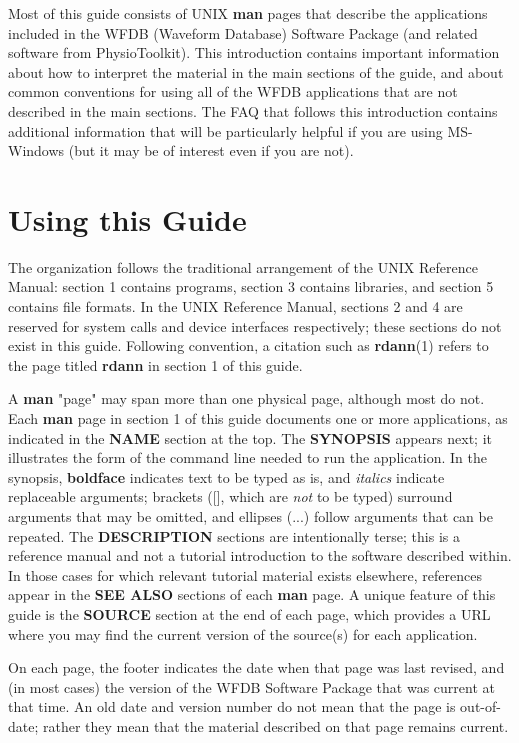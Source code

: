 \documentclass[twoside]{book}
\begin{document}
Most of this guide consists of UNIX \textbf{man} pages that describe the
applications included in the WFDB (Waveform Database) Software
Package (and related software from PhysioToolkit).  This introduction
contains important information about how to interpret the material in
the main sections of the guide, and about common conventions for using
all of the WFDB applications that are not described in the main sections.
The FAQ that follows this introduction contains additional information
that will be particularly helpful if you are using MS-Windows (but it
may be of interest even if you are not).

\section*{Using this Guide}

The organization follows the traditional arrangement of the UNIX Reference
Manual:  section 1 contains programs, section 3 contains libraries, and
section 5 contains file formats.  In the UNIX Reference Manual, sections
2 and 4 are reserved for system calls and device interfaces respectively;
these sections do not exist in this guide.  Following convention, a
citation such as \textbf{rdann}(1) refers to the page titled \textbf{rdann}
in section 1 of this guide.

A \textbf{man} "page" may span more than one physical page, although most do
not.  Each \textbf{man} page in section 1 of this guide documents one or more
applications, as indicated in the \textbf{NAME} section at the top.  The
\textbf{SYNOPSIS} appears next; it illustrates the form of the command line
needed to run the application.  In the synopsis, \textbf{boldface} indicates
text to be typed as is, and \textit{italics} indicate replaceable arguments;
brackets ([], which are \textit{not} to be typed) surround arguments that may
be omitted, and ellipses (...) follow arguments that can be repeated.  The
\textbf{DESCRIPTION} sections are intentionally terse; this is a reference
manual and not a tutorial introduction to the software described within.  In
those cases for which relevant tutorial material exists elsewhere, references
appear in the \textbf{SEE ALSO} sections of each \textbf{man} page.  A unique
feature of this guide is the \textbf{SOURCE} section at the end of each page,
which provides a URL where you may find the current version of the source(s)
for each application.

On each page, the footer indicates the date when that page was last revised,
and (in most cases) the version of the WFDB Software Package that was current
at that time.  An old date and version number do not mean that the page is
out-of-date;  rather they mean that the material described on that page
remains current.
\end{document}
